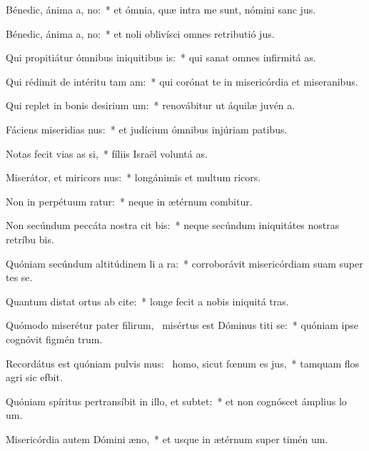\item Bénedic, ánima a, no:~* et ómnia, quæ intra me sunt, nómini sanc jus.
\item Bénedic, ánima a, no:~* et noli oblivísci omnes retributió jus.
\item Qui propitiátur ómnibus iniquitibus is:~* qui sanat omnes infirmitá as.
\item Qui rédimit de intéritu tam am:~* qui corónat te in misericórdia et miseranibus.
\item Qui replet in bonis desirium um:~* renovábitur ut áquilæ juvén a.
\item Fáciens miseridias nus:~* et judícium ómnibus injúriam patibus.
\item Notas fecit vias as si,~* fíliis Israël voluntá as.
\item Miserátor, et miricors nus:~* longánimis et multum ricors.
\item Non in perpétuum ratur:~* neque in ætérnum combitur.
\item Non secúndum peccáta nostra cit bis:~* neque secúndum iniquitátes nostras retríbu bis.
\item Quóniam secúndum altitúdinem li a ra:~* corroborávit misericórdiam suam super tes se.
\item Quantum distat ortus ab cite:~* longe fecit a nobis iniquitá tras.
\item Quómodo miserétur pater filirum,~\pscross{} misértus est Dóminus titi se:~* quóniam ipse cognóvit figmén trum.
\item Recordátus est quóniam pulvis mus:~\pscross{} homo, sicut fœnum es jus,~* tamquam flos agri sic efbit.
\item Quóniam spíritus pertransíbit in illo, et  subtet:~* et non cognóscet ámplius lo um.
\item Misericórdia autem Dómini  æno,~* et usque in ætérnum super timén um.
